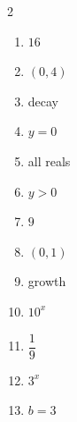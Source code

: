\documentclass[11pt]{article}
\begin{document}
\begin{keybox}
\begin{multicols}{2}
\small
\begin{enumerate}[leftmargin=*,itemsep=3pt]
  \item $16$
  \item $(0,4)$
  \item decay
  \item $y=0$
  \item all reals
  \item $y>0$
  \item $9$
  \item $(0,1)$
  \item growth
  \item $10^x$
  \item $\dfrac19$
  \item $3^x$
  \item $b=3$
\end{enumerate}
\end{multicols}
\end{keybox}
\end{document}
